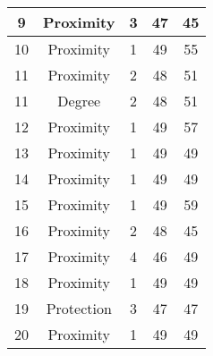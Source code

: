 \documentclass[results.tex]{subfiles}
\begin{document}
\begin{center}
\begin{tabular}{| c || c | c | c | c |}
            \hline
            9                       & Proximity                    & 3                      & 47                      & 45                   \\
            \hline
            10                      & Proximity                    & 1                      & 49                      & 55                   \\
            \hline
            11                      & Proximity                    & 2                      & 48                      & 51                   \\
            \hline
            11                      & Degree                       & 2                      & 48                      & 51                   \\
            \hline
            12                      & Proximity                    & 1                      & 49                      & 57                   \\
            \hline
            13                      & Proximity                    & 1                      & 49                      & 49                   \\
            \hline
            14                      & Proximity                    & 1                      & 49                      & 49                   \\
            \hline
            15                      & Proximity                    & 1                      & 49                      & 59                   \\
            \hline
            16                      & Proximity                    & 2                      & 48                      & 45                   \\
            \hline
            17                      & Proximity                    & 4                      & 46                      & 49                   \\
            \hline
            18                      & Proximity                    & 1                      & 49                      & 49                   \\
            \hline
            19                      & Protection                   & 3                      & 47                      & 47                   \\
            \hline
            20                      & Proximity                    & 1                      & 49                      & 49                   \\

\end{tabular}
\end{center}
\end{document}
